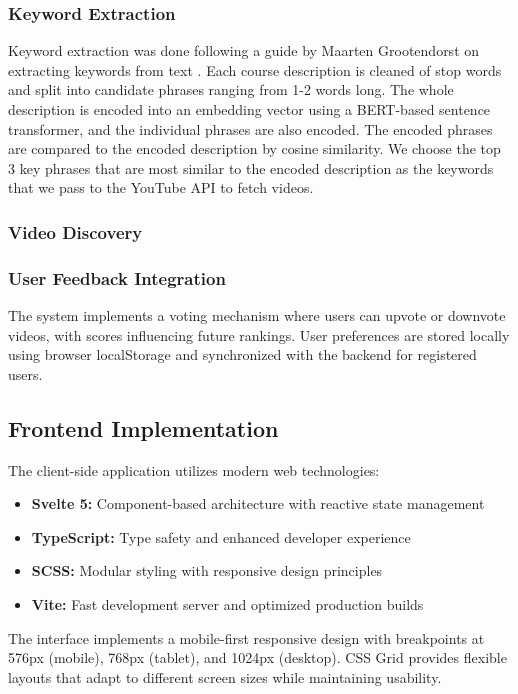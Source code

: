 \documentclass[manuscript,nonacm]{acmart}
\begin{document}
\subsubsection{Keyword Extraction}
Keyword extraction was done following a guide by Maarten Grootendorst on extracting keywords from text \cite{Grootendorst}. Each course description is cleaned of stop words and split into candidate phrases ranging from 1-2 words long. The whole description is encoded into an embedding vector using a BERT-based sentence transformer, and the individual phrases are also encoded. The encoded phrases are compared to the encoded description by cosine similarity. We choose the top 3 key phrases that are most similar to the encoded description as the keywords that we pass to the YouTube API to fetch videos.

\subsubsection{Video Discovery}

\subsubsection{User Feedback Integration}
The system implements a voting mechanism where users can upvote or downvote videos, with scores influencing future rankings. User preferences are stored locally using browser localStorage and synchronized with the backend for registered users.

\subsection{Frontend Implementation}

The client-side application utilizes modern web technologies:

\begin{itemize}
    \item \textbf{Svelte 5:} Component-based architecture with reactive state management
    \item \textbf{TypeScript:} Type safety and enhanced developer experience
    \item \textbf{SCSS:} Modular styling with responsive design principles
    \item \textbf{Vite:} Fast development server and optimized production builds
\end{itemize}

The interface implements a mobile-first responsive design with breakpoints at 576px (mobile), 768px (tablet), and 1024px (desktop). CSS Grid provides flexible layouts that adapt to different screen sizes while maintaining usability.
\end{document}
